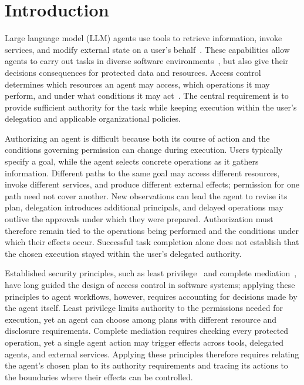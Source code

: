 \section{Introduction}
Large language model (LLM) agents use tools to retrieve information, invoke services, and modify external state on a user's behalf~\cite{react,toolemu}. These capabilities allow agents to carry out tasks in diverse software environments~\cite{agentbench}, but also give their decisions consequences for protected data and resources. Access control determines which resources an agent may access, which operations it may perform, and under what conditions it may act~\cite{progent,saga}. The central requirement is to provide sufficient authority for the task while keeping execution within the user's delegation and applicable organizational policies.

Authorizing an agent is difficult because both its course of action and the conditions governing permission can change during execution. Users typically specify a goal, while the agent selects concrete operations as it gathers information. Different paths to the same goal may access different resources, invoke different services, and produce different external effects; permission for one path need not cover another. New observations can lead the agent to revise its plan, delegation introduces additional principals, and delayed operations may outlive the approvals under which they were prepared. Authorization must therefore remain tied to the operations being performed and the conditions under which their effects occur. Successful task completion alone does not establish that the chosen execution stayed within the user's delegated authority.

Established security principles, such as least privilege~\cite{saltzer,privsep,capsicum} and complete mediation~\cite{saltzer,schneider,sasi}, have long guided the design of access control in software systems; applying these principles to agent workflows, however, requires accounting for decisions made by the agent itself. Least privilege limits authority to the permissions needed for execution, yet an agent can choose among plans with different resource and disclosure requirements. Complete mediation requires checking every protected operation, yet a single agent action may trigger effects across tools, delegated agents, and external services. Applying these principles therefore requires relating the agent's chosen plan to its authority requirements and tracing its actions to the boundaries where their effects can be controlled.

